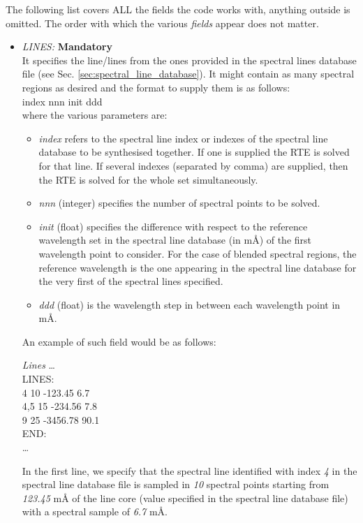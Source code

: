 The following list covers ALL the fields the code works with, anything outside is omitted. The order with which the various {\it fields} appear does not matter.\\
\begin{itemize}
  \item {\it LINES:} {\bf Mandatory}\\
  It specifies the line/lines from the ones provided in the spectral lines database file (see Sec. \ref{sec:spectral_line_database}). It might contain as many spectral regions as desired and the format to supply them is as follows:\\
  index  nnn   init    ddd\\
  where the various parameters are:
  \begin{itemize}
    \item {\it index} refers to the spectral line index or indexes of the spectral line database to be synthesised together. If one is supplied the RTE is solved for that line. If several indexes (separated by comma) are supplied, then the RTE is solved for the whole set simultaneously.
    \item {\it nnn} (integer) specifies the number of spectral points to be solved.
    \item {\it init} (float) specifies the difference with respect to the reference wavelength set in the spectral line database (in m{\AA}) of the first wavelength point to consider. For the case of blended spectral regions, the reference wavelength is the one appearing in the spectral line database for the very first of the spectral lines specified.
    \item {\it ddd} (float) is the wavelength step in between each wavelength point in m{\AA}.
  \end{itemize}
  An example of such field would be as follows:\\
\begin{ifbox}[label={tb:lines}]{{\it Lines}}
  \scriptsize
  \ldots\\
  LINES:\\
  4 10 -123.45 6.7\\
  4,5 15 -234.56 7.8\\
  9 25 -3456.78 90.1\\
  END:\\
  \ldots
  \normalsize
\end{ifbox}
  In the first line, we specify that the spectral line identified with index {\it 4} in the spectral line database file is sampled in {\it 10} spectral points starting from {\it 123.45} m{\AA} of the line core (value specified in the spectral line database file) with a spectral sample of {\it 6.7} m{\AA}.

\end{itemize}
